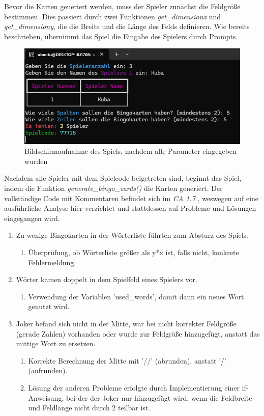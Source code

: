 \documentclass{llncs}
\begin{document}
Bevor die Karten generiert werden, muss der Spieler zunächst die Feldgröße bestimmen. Dies passiert durch zwei Funktionen \textit{get\_dimensionx} und \textit{get\_dimensiony}, die die Breite und die Länge des Felds definieren. Wie bereits beschrieben, übernimmt das Spiel die Eingabe des Spielers durch Prompts.


\begin{figure}
    \centering
    \includegraphics[width=1\linewidth]{Input.png}
    \caption{Bildschirmaufnahme des Spiels, nachdem alle Parameter eingegeben wurden}
    \label{fig:ssGame1}
\end{figure}

Nachdem alle Spieler mit dem Spielcode beigetreten sind, beginnt das Spiel, indem die Funktion \textit{generate\_bingo\_cards()} die Karten generiert. Der vollständige Code mit Kommentaren befindet sich im \textit{CA 1.7} , weswegen auf eine ausführliche Analyse hier verzichtet und stattdessen auf Probleme und Lösungen eingegangen wird.

\begin{enumerate}
\item Zu wenige Bingokarten in der Wörterliste führten zum Absturz des Spiels.
\begin{enumerate}
\item Überprüfung, ob Wörterliste größer als y*x ist, falls nicht, konkrete Fehlermeldung.
\end{enumerate}
\item Wörter kamen doppelt in dem Spielfeld eines Spielers vor.
\begin{enumerate}
\item Verwendung der Variablen 'used\_words', damit dann ein neues Wort genutzt wird.
\end{enumerate}
\item Joker befand sich nicht in der Mitte, war bei nicht korrekter Feldgröße (gerade Zahlen) vorhanden oder wurde zur Feldgröße hinzugefügt, anstatt das mittige Wort zu ersetzen. 
\begin{enumerate}
\item Korrekte Berechnung der Mitte mit '//' (abrunden), anstatt '/' (aufrunden).
\item Lösung der anderen Probleme erfolgte durch Implementierung einer if-Anweisung, bei der der Joker nur hinzugefügt wird, wenn die Feldbreite und Feldlänge nicht durch 2 teilbar ist. 
\end{enumerate}
\end{enumerate}
\end{document}
